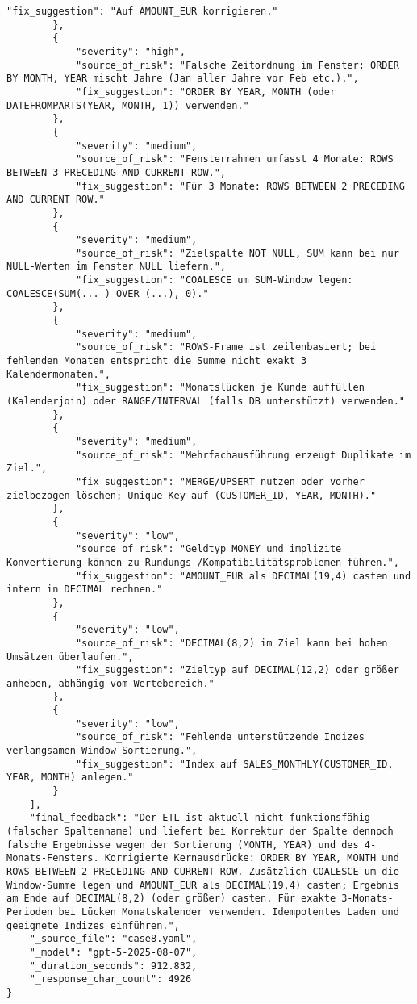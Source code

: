 \begin{lstlisting}[caption={Ausgabe: GPT-5 Anwendungsfall 8 Hauptdurchlauf},label={gpt_case8_prompt1}]
            "fix_suggestion": "Auf AMOUNT_EUR korrigieren."
        },
        {
            "severity": "high",
            "source_of_risk": "Falsche Zeitordnung im Fenster: ORDER BY MONTH, YEAR mischt Jahre (Jan aller Jahre vor Feb etc.).",
            "fix_suggestion": "ORDER BY YEAR, MONTH (oder DATEFROMPARTS(YEAR, MONTH, 1)) verwenden."
        },
        {
            "severity": "medium",
            "source_of_risk": "Fensterrahmen umfasst 4 Monate: ROWS BETWEEN 3 PRECEDING AND CURRENT ROW.",
            "fix_suggestion": "Für 3 Monate: ROWS BETWEEN 2 PRECEDING AND CURRENT ROW."
        },
        {
            "severity": "medium",
            "source_of_risk": "Zielspalte NOT NULL, SUM kann bei nur NULL-Werten im Fenster NULL liefern.",
            "fix_suggestion": "COALESCE um SUM-Window legen: COALESCE(SUM(... ) OVER (...), 0)."
        },
        {
            "severity": "medium",
            "source_of_risk": "ROWS-Frame ist zeilenbasiert; bei fehlenden Monaten entspricht die Summe nicht exakt 3 Kalendermonaten.",
            "fix_suggestion": "Monatslücken je Kunde auffüllen (Kalenderjoin) oder RANGE/INTERVAL (falls DB unterstützt) verwenden."
        },
        {
            "severity": "medium",
            "source_of_risk": "Mehrfachausführung erzeugt Duplikate im Ziel.",
            "fix_suggestion": "MERGE/UPSERT nutzen oder vorher zielbezogen löschen; Unique Key auf (CUSTOMER_ID, YEAR, MONTH)."
        },
        {
            "severity": "low",
            "source_of_risk": "Geldtyp MONEY und implizite Konvertierung können zu Rundungs-/Kompatibilitätsproblemen führen.",
            "fix_suggestion": "AMOUNT_EUR als DECIMAL(19,4) casten und intern in DECIMAL rechnen."
        },
        {
            "severity": "low",
            "source_of_risk": "DECIMAL(8,2) im Ziel kann bei hohen Umsätzen überlaufen.",
            "fix_suggestion": "Zieltyp auf DECIMAL(12,2) oder größer anheben, abhängig vom Wertebereich."
        },
        {
            "severity": "low",
            "source_of_risk": "Fehlende unterstützende Indizes verlangsamen Window-Sortierung.",
            "fix_suggestion": "Index auf SALES_MONTHLY(CUSTOMER_ID, YEAR, MONTH) anlegen."
        }
    ],
    "final_feedback": "Der ETL ist aktuell nicht funktionsfähig (falscher Spaltenname) und liefert bei Korrektur der Spalte dennoch falsche Ergebnisse wegen der Sortierung (MONTH, YEAR) und des 4-Monats-Fensters. Korrigierte Kernausdrücke: ORDER BY YEAR, MONTH und ROWS BETWEEN 2 PRECEDING AND CURRENT ROW. Zusätzlich COALESCE um die Window-Summe legen und AMOUNT_EUR als DECIMAL(19,4) casten; Ergebnis am Ende auf DECIMAL(8,2) (oder größer) casten. Für exakte 3-Monats-Perioden bei Lücken Monatskalender verwenden. Idempotentes Laden und geeignete Indizes einführen.",
    "_source_file": "case8.yaml",
    "_model": "gpt-5-2025-08-07",
    "_duration_seconds": 912.832,
    "_response_char_count": 4926
}
\end{lstlisting}

